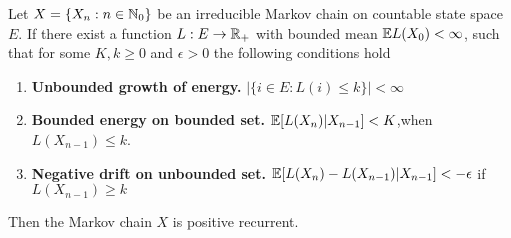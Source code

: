 \documentclass[a4paper,10pt,english]{article}
\begin{document}
\begin{thm}[F. G. Foster,1950]
Let $X = \{X_n: n \in \mathbb{N}_0\}$ be an irreducible Markov chain on countable state space $E$.
If there exist a function $L : E \to \mathbb{R}_+$ with bounded mean $\mathbb{E} L(X_0) < \infty$, such that for some $K, k \geq 0$ and $\epsilon>0$ the following conditions hold
\begin{enumerate}[i\_]
\item \textbf{Unbounded growth of energy.} $|\{i \in E: L(i) \leq k\}| < \infty$
\item \textbf{Bounded energy on bounded set.} $\mathbb{E}[L(X_n)|X_{n-1}] < K$,when $L(X_{n-1}) \leq k$.
\item \textbf{Negative drift on unbounded set.} $\mathbb{E}[L(X_n)-L(X_{n-1})|X_{n-1}] < -\epsilon$ if $L(X_{n-1})\geq k$
\end{enumerate}
Then the Markov chain $X$ is positive recurrent. 
\end{thm}
\end{document}
